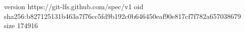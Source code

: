 version https://git-lfs.github.com/spec/v1
oid sha256:b827125131b463a7f76cc5fd9b192c0b646450eaf90e817cf7f782a657038679
size 174916
